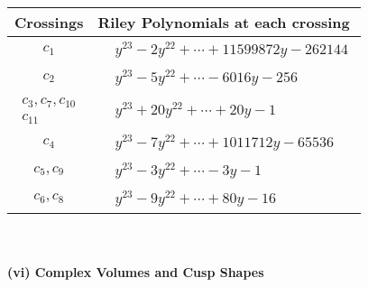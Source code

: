 \documentclass[1p]{elsarticle_modified}
\theoremstyle{definition}
\begin{document}
\begin{tabular}{m{50pt}|m{274pt}}
Crossings & \hspace{64pt}Riley Polynomials at each crossing \\
\hline $$\begin{aligned}c_{1}\end{aligned}$$&$\begin{aligned}
&y^{23}-2 y^{22}+\cdots+11599872 y-262144
\end{aligned}$\\
\hline $$\begin{aligned}c_{2}\end{aligned}$$&$\begin{aligned}
&y^{23}-5 y^{22}+\cdots-6016 y-256
\end{aligned}$\\
\hline $$\begin{aligned}c_{3},c_{7},c_{10}\\c_{11}\end{aligned}$$&$\begin{aligned}
&y^{23}+20 y^{22}+\cdots+20 y-1
\end{aligned}$\\
\hline $$\begin{aligned}c_{4}\end{aligned}$$&$\begin{aligned}
&y^{23}-7 y^{22}+\cdots+1011712 y-65536
\end{aligned}$\\
\hline $$\begin{aligned}c_{5},c_{9}\end{aligned}$$&$\begin{aligned}
&y^{23}-3 y^{22}+\cdots-3 y-1
\end{aligned}$\\
\hline $$\begin{aligned}c_{6},c_{8}\end{aligned}$$&$\begin{aligned}
&y^{23}-9 y^{22}+\cdots+80 y-16
\end{aligned}$\\
\hline
\end{tabular}\\~\\
\newpage\flushleft \textbf{(vi) Complex Volumes and Cusp Shapes}
\end{document}
